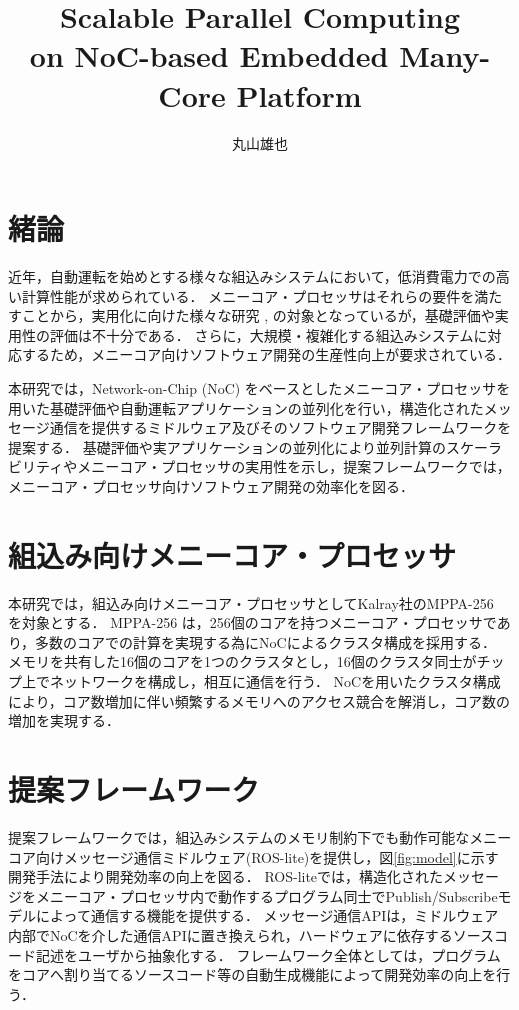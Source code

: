 \documentclass[a4j,10pt,twocolumn]{abstract}
\title{Scalable Parallel Computing \\ on NoC-based Embedded Many-Core Platform}	%
\author{丸山雄也} 		%
\begin{document}
\absttitle 		%

\section{緒論}
近年，自動運転を始めとする様々な組込みシステムにおいて，低消費電力での高い計算性能が求められている．
メニーコア・プロセッサはそれらの要件を満たすことから，実用化に向けた様々な研究 \cite{BURGIO20172992}, \cite{de2013clustered2} の対象となっているが，基礎評価や実用性の評価は不十分である．
さらに，大規模・複雑化する組込みシステムに対応するため，メニーコア向けソフトウェア開発の生産性向上が要求されている．

本研究では，Network-on-Chip (NoC) をベースとしたメニーコア・プロセッサを用いた基礎評価や自動運転アプリケーションの並列化を行い，構造化されたメッセージ通信を提供するミドルウェア及びそのソフトウェア開発フレームワークを提案する．
基礎評価や実アプリケーションの並列化により並列計算のスケーラビリティやメニーコア・プロセッサの実用性を示し，提案フレームワークでは，メニーコア・プロセッサ向けソフトウェア開発の効率化を図る．

\section{組込み向けメニーコア・プロセッサ}
本研究では，組込み向けメニーコア・プロセッサとしてKalray社のMPPA-256 \cite{de2013clustered2} を対象とする．
MPPA-256 は，256個のコアを持つメニーコア・プロセッサであり，多数のコアでの計算を実現する為にNoCによるクラスタ構成を採用する．
メモリを共有した16個のコアを1つのクラスタとし，16個のクラスタ同士がチップ上でネットワークを構成し，相互に通信を行う．
NoCを用いたクラスタ構成により，コア数増加に伴い頻繁するメモリへのアクセス競合を解消し，コア数の増加を実現する．

\section{提案フレームワーク}
提案フレームワークでは，組込みシステムのメモリ制約下でも動作可能なメニーコア向けメッセージ通信ミドルウェア(ROS-lite)を提供し，図\ref{fig:model}に示す開発手法により開発効率の向上を図る．
ROS-liteでは，構造化されたメッセージをメニーコア・プロセッサ内で動作するプログラム同士でPublish/Subscribeモデルによって通信する機能を提供する．
メッセージ通信APIは，ミドルウェア内部でNoCを介した通信APIに置き換えられ，ハードウェアに依存するソースコード記述をユーザから抽象化する．
フレームワーク全体としては，プログラムをコアへ割り当てるソースコード等の自動生成機能によって開発効率の向上を行う．
\end{document}

